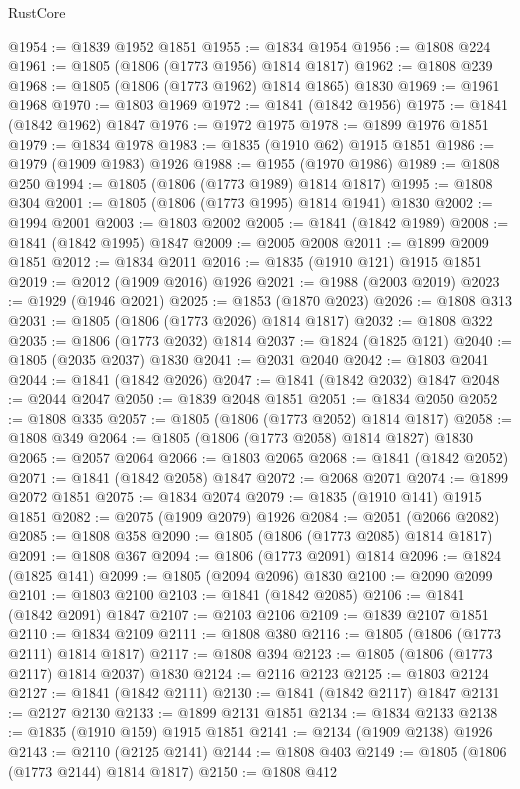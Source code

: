 \begin{lexlean}{RustCore}
\begin{coremodule}
@1954 := @1839 @1952 @1851
@1955 := @1834 @1954
@1956 := @1808 @224
@1961 := @1805 (@1806 (@1773 @1956) @1814 @1817)
@1962 := @1808 @239
@1968 := @1805 (@1806 (@1773 @1962) @1814 @1865) @1830
@1969 := @1961 @1968
@1970 := @1803 @1969
@1972 := @1841 (@1842 @1956)
@1975 := @1841 (@1842 @1962) @1847
@1976 := @1972 @1975
@1978 := @1899 @1976 @1851
@1979 := @1834 @1978
@1983 := @1835 (@1910 @62) @1915 @1851
@1986 := @1979 (@1909 @1983) @1926
@1988 := @1955 (@1970 @1986)
@1989 := @1808 @250
@1994 := @1805 (@1806 (@1773 @1989) @1814 @1817)
@1995 := @1808 @304
@2001 := @1805 (@1806 (@1773 @1995) @1814 @1941) @1830
@2002 := @1994 @2001
@2003 := @1803 @2002
@2005 := @1841 (@1842 @1989)
@2008 := @1841 (@1842 @1995) @1847
@2009 := @2005 @2008
@2011 := @1899 @2009 @1851
@2012 := @1834 @2011
@2016 := @1835 (@1910 @121) @1915 @1851
@2019 := @2012 (@1909 @2016) @1926
@2021 := @1988 (@2003 @2019)
@2023 := @1929 (@1946 @2021)
@2025 := @1853 (@1870 @2023)
@2026 := @1808 @313
@2031 := @1805 (@1806 (@1773 @2026) @1814 @1817)
@2032 := @1808 @322
@2035 := @1806 (@1773 @2032) @1814
@2037 := @1824 (@1825 @121)
@2040 := @1805 (@2035 @2037) @1830
@2041 := @2031 @2040
@2042 := @1803 @2041
@2044 := @1841 (@1842 @2026)
@2047 := @1841 (@1842 @2032) @1847
@2048 := @2044 @2047
@2050 := @1839 @2048 @1851
@2051 := @1834 @2050
@2052 := @1808 @335
@2057 := @1805 (@1806 (@1773 @2052) @1814 @1817)
@2058 := @1808 @349
@2064 := @1805 (@1806 (@1773 @2058) @1814 @1827) @1830
@2065 := @2057 @2064
@2066 := @1803 @2065
@2068 := @1841 (@1842 @2052)
@2071 := @1841 (@1842 @2058) @1847
@2072 := @2068 @2071
@2074 := @1899 @2072 @1851
@2075 := @1834 @2074
@2079 := @1835 (@1910 @141) @1915 @1851
@2082 := @2075 (@1909 @2079) @1926
@2084 := @2051 (@2066 @2082)
@2085 := @1808 @358
@2090 := @1805 (@1806 (@1773 @2085) @1814 @1817)
@2091 := @1808 @367
@2094 := @1806 (@1773 @2091) @1814
@2096 := @1824 (@1825 @141)
@2099 := @1805 (@2094 @2096) @1830
@2100 := @2090 @2099
@2101 := @1803 @2100
@2103 := @1841 (@1842 @2085)
@2106 := @1841 (@1842 @2091) @1847
@2107 := @2103 @2106
@2109 := @1839 @2107 @1851
@2110 := @1834 @2109
@2111 := @1808 @380
@2116 := @1805 (@1806 (@1773 @2111) @1814 @1817)
@2117 := @1808 @394
@2123 := @1805 (@1806 (@1773 @2117) @1814 @2037) @1830
@2124 := @2116 @2123
@2125 := @1803 @2124
@2127 := @1841 (@1842 @2111)
@2130 := @1841 (@1842 @2117) @1847
@2131 := @2127 @2130
@2133 := @1899 @2131 @1851
@2134 := @1834 @2133
@2138 := @1835 (@1910 @159) @1915 @1851
@2141 := @2134 (@1909 @2138) @1926
@2143 := @2110 (@2125 @2141)
@2144 := @1808 @403
@2149 := @1805 (@1806 (@1773 @2144) @1814 @1817)
@2150 := @1808 @412

\end{coremodule}
\end{lexlean}
